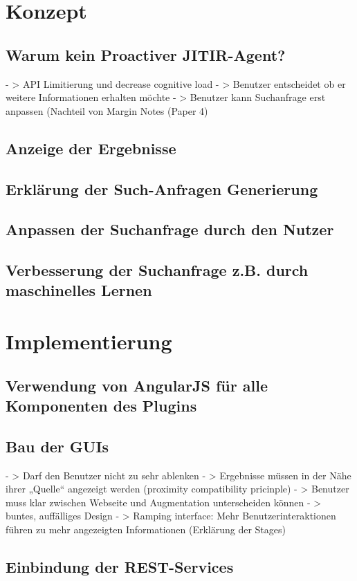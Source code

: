 \section{Konzept}
 \subsection{Warum kein Proactiver JITIR-Agent?}
 	- > API Limitierung und decrease cognitive load 
	- > Benutzer entscheidet ob er weitere Informationen erhalten möchte
	- > Benutzer kann Suchanfrage erst anpassen (Nachteil von Margin Notes (Paper 4)
 \subsection{Anzeige der Ergebnisse}
 \subsection{Erklärung der Such-Anfragen Generierung}
 \subsection{Anpassen der Suchanfrage durch den Nutzer}
 \subsection{Verbesserung der Suchanfrage z.B. durch maschinelles Lernen}

\section{Implementierung}
 \subsection{Verwendung von AngularJS für alle Komponenten des Plugins}
 \subsection{Bau der GUIs}
		- > Darf den Benutzer nicht zu sehr ablenken
		- > Ergebnisse müssen in der Nähe ihrer „Quelle“ angezeigt werden (proximity compatibility pricinple)
		- > Benutzer muss klar zwischen Webseite und Augmentation unterscheiden können
		- > buntes, auffälliges Design
		- > Ramping interface: Mehr Benutzerinteraktionen führen zu mehr angezeigten Informationen (Erklärung der Stages) 
 \subsection{Einbindung der REST-Services}

